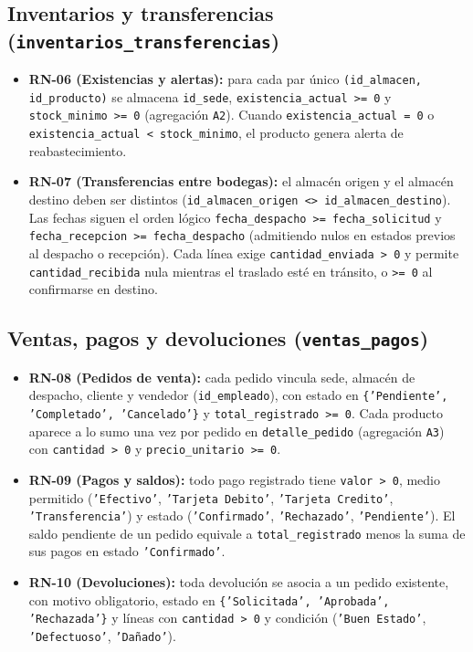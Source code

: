 \documentclass[11pt,oneside]{article}
\begin{document}
\subsection{Inventarios y transferencias (\texttt{inventarios\_transferencias})}
\begin{itemize}[leftmargin=1.5em, itemsep=2.5pt]
  \item \textbf{RN-06 (Existencias y alertas):} para cada par \'unico
        \texttt{(id\_almacen, id\_producto)} se almacena \texttt{id\_sede},
        \texttt{existencia\_\allowbreak actual >= 0} y
        \texttt{stock\_minimo >= 0}
        (agregaci\'on \texttt{A2}). Cuando \texttt{existencia\_actual = 0} o
        \texttt{existencia\_actual < stock\_minimo}, el producto genera alerta
        de reabastecimiento.
  \item \textbf{RN-07 (Transferencias entre bodegas):} el almac\'en origen y
        el almac\'en destino deben ser distintos
        (\texttt{id\_almacen\_origen <> id\_almacen\_destino}). Las fechas
        siguen el orden l\'ogico \texttt{fecha\_despacho >= fecha\_solicitud} y
        \texttt{fecha\_recepcion >= fecha\_despacho} (admitiendo nulos en
        estados previos al despacho o recepci\'on). Cada l\'inea exige
        \texttt{cantidad\_enviada > 0} y permite \texttt{cantidad\_recibida}
        nula mientras el traslado est\'e en tr\'ansito, o \texttt{>= 0} al
        confirmarse en destino.
\end{itemize}

\subsection{Ventas, pagos y devoluciones (\texttt{ventas\_pagos})}
\begin{itemize}[leftmargin=1.5em, itemsep=2.5pt]
  \item \textbf{RN-08 (Pedidos de venta):} cada pedido vincula sede, almac\'en
        de despacho, cliente y vendedor (\texttt{id\_\allowbreak empleado}),
        con estado en \texttt{\{'Pendiente', 'Completado', 'Cancelado'\}} y
        \texttt{total\_registrado >= 0}. Cada producto aparece a lo sumo una vez
        por pedido en \texttt{detalle\_pedido} (agregaci\'on \texttt{A3}) con
        \texttt{cantidad > 0} y \texttt{precio\_unitario >= 0}.
  \item \textbf{RN-09 (Pagos y saldos):} todo pago registrado tiene
        \texttt{valor > 0}, medio permitido (\texttt{'Efectivo'},
        \texttt{'Tarjeta Debito'}, \texttt{'Tarjeta Credito'},
        \texttt{'Transferencia'}) y estado (\texttt{'Confirmado'},
        \texttt{'Rechazado'}, \texttt{'Pendiente'}). El saldo pendiente de un
        pedido equivale a \texttt{total\_registrado} menos la suma de sus pagos
        en estado \texttt{'Confirmado'}.
  \item \textbf{RN-10 (Devoluciones):} toda devoluci\'on se asocia a un pedido
        existente, con motivo obligatorio, estado en \texttt{\{'Solicitada',
        'Aprobada', 'Rechazada'\}} y l\'ineas con \texttt{cantidad > 0} y
        condici\'on (\texttt{'Buen Estado'}, \texttt{'Defectuoso'},
        \texttt{'Da\~nado'}).
\end{itemize}
\end{document}
